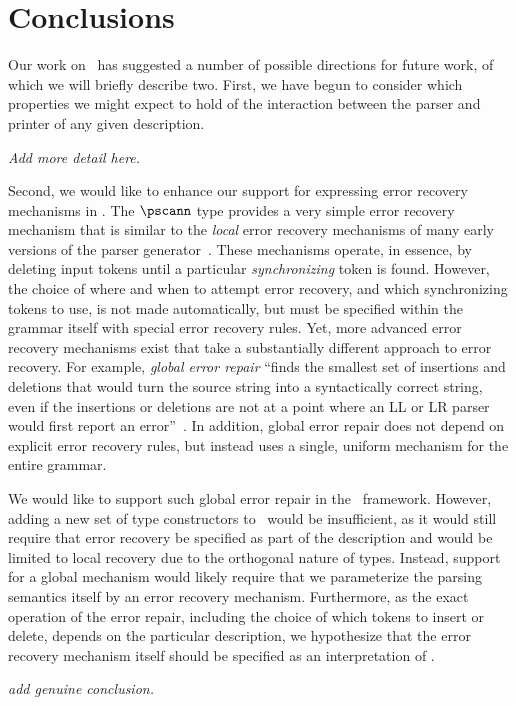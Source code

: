 \section{Conclusions}
\label{sec:future}

Our work on \ddc\ has suggested a number of possible directions for
future work, of which we will briefly describe two. First, we have
begun to consider which properties we might expect to hold of the
interaction between the parser and printer of any given description.

{\em Add more detail here.}

Second, we would like to enhance our support for expressing error
recovery mechanisms in \ddc. The $\pscann$ type provides a very simple
error recovery mechanism that is similar to the {\em local} error
recovery mechanisms of many early versions of the
\yacc{} parser generator~\cite{appel:mci}.  These mechanisms operate,
in essence, by deleting input tokens until a particular {\em
  synchronizing} token is found. However, the choice of where and when
to attempt error recovery, and which synchronizing tokens to use, is
not made automatically, but must be specified within the grammar
itself with special error recovery rules.  Yet, more advanced error
recovery mechanisms exist that take a substantially different approach
to error recovery. For example, {\em global error repair} ``finds the
smallest set of insertions and deletions that would turn the source
string into a syntactically correct string, even if the insertions or
deletions are not at a point where an LL or LR parser would first
report an error''~\cite{appel:mci}. In addition, global error repair
does not depend on explicit error recovery rules, but instead uses a
single, uniform mechanism for the entire grammar.


We would like to support such global error repair in the \ddc\
framework. However, adding a new set of type constructors to \ddc\
would be insufficient, as it would still require that error recovery
be specified as part of the description and would be limited to local
recovery due to the orthogonal nature of types.  Instead, support for
a global mechanism would likely require that we parameterize the
parsing semantics itself by an error recovery mechanism. Furthermore,
as the exact operation of the error repair, including the choice of
which tokens to insert or delete, depends on the particular
description, we hypothesize that the error recovery mechanism itself
should be specified as an interpretation of \ddc.


{\em add genuine conclusion.}
